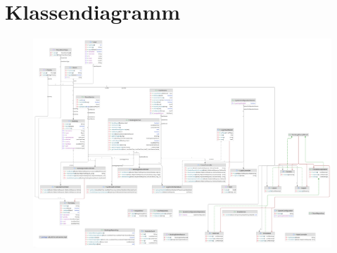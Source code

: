 \section{Klassendiagramm}
\begin{figure}[ht]
    \centering
    \includegraphics[angle=90, height=1.1\textwidth]{figures/classes}
    \label{fig:klassendiagramm}
\end{figure}
\clearpage